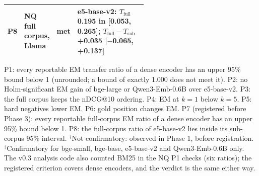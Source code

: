 \begin{table}[t]
\begin{tabular}{lllp{0.55\linewidth}}
P8 & NQ full corpus, Llama & met & e5-base-v2: $T_\text{full}$ 0.195 in [0.053, 0.265]; $T_\text{full}-T_\text{sub}$ +0.035 [$-$0.065, +0.137] \\
\bottomrule
\end{tabular}
\par\smallskip\parbox{\linewidth}{\footnotesize P1: every reportable EM transfer ratio of a dense encoder has an upper 95\% bound below 1 (unrounded; a bound of exactly 1.000 does not meet it). P2: no Holm-significant EM gain of bge-large or Qwen3-Emb-0.6B over e5-base-v2. P3: the full corpus keeps the nDCG@10 ordering. P4: EM at $k{=}1$ below $k{=}5$. P5: hard negatives lower EM. P6: gold position changes EM. P7 (registered before Phase 3): every reportable full-corpus EM ratio of a dense encoder has an upper 95\% bound below 1. P8: the full-corpus ratio of e5-base-v2 lies inside its sub-corpus 95\% interval. $^\dagger$Not confirmatory: observed in Phase 1, before registration. $^\ddagger$Confirmatory for bge-small, bge-base, e5-base-v2 and Qwen3-Emb-0.6B only. The v0.3 analysis code also counted BM25 in the NQ P1 checks (six ratios); the registered criterion covers dense encoders, and the verdict is the same either way.}
\end{table}
